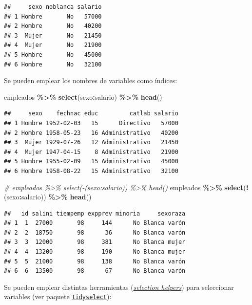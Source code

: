 \documentclass[
]{book}
\newenvironment{Shaded}{\begin{snugshade}}{\end{snugshade}}
\newcommand{\CommentTok}[1]{\textcolor[rgb]{0.56,0.35,0.01}{\textit{#1}}}
\newcommand{\FunctionTok}[1]{\textcolor[rgb]{0.13,0.29,0.53}{\textbf{#1}}}
\newcommand{\NormalTok}[1]{#1}
\newcommand{\SpecialCharTok}[1]{\textcolor[rgb]{0.81,0.36,0.00}{\textbf{#1}}}
\begin{document}
\begin{verbatim}
##     sexo noblanca salario
## 1 Hombre       No   57000
## 2 Hombre       No   40200
## 3  Mujer       No   21450
## 4  Mujer       No   21900
## 5 Hombre       No   45000
## 6 Hombre       No   32100
\end{verbatim}

Se pueden emplear los nombres de variables como índices:

\begin{Shaded}
\begin{Highlighting}[]
\NormalTok{empleados }\SpecialCharTok{\%\textgreater{}\%} \FunctionTok{select}\NormalTok{(sexo}\SpecialCharTok{:}\NormalTok{salario) }\SpecialCharTok{\%\textgreater{}\%} \FunctionTok{head}\NormalTok{()}
\end{Highlighting}
\end{Shaded}

\begin{verbatim}
##     sexo    fechnac educ         catlab salario
## 1 Hombre 1952-02-03   15      Directivo   57000
## 2 Hombre 1958-05-23   16 Administrativo   40200
## 3  Mujer 1929-07-26   12 Administrativo   21450
## 4  Mujer 1947-04-15    8 Administrativo   21900
## 5 Hombre 1955-02-09   15 Administrativo   45000
## 6 Hombre 1958-08-22   15 Administrativo   32100
\end{verbatim}

\begin{Shaded}
\begin{Highlighting}[]
\CommentTok{\# empleados \%\textgreater{}\% select({-}(sexo:salario)) \%\textgreater{}\% head()}
\NormalTok{empleados }\SpecialCharTok{\%\textgreater{}\%} \FunctionTok{select}\NormalTok{(}\SpecialCharTok{!}\NormalTok{(sexo}\SpecialCharTok{:}\NormalTok{salario)) }\SpecialCharTok{\%\textgreater{}\%} \FunctionTok{head}\NormalTok{()}
\end{Highlighting}
\end{Shaded}

\begin{verbatim}
##   id salini tiempemp expprev minoria     sexoraza
## 1  1  27000       98     144      No Blanca varón
## 2  2  18750       98      36      No Blanca varón
## 3  3  12000       98     381      No Blanca mujer
## 4  4  13200       98     190      No Blanca mujer
## 5  5  21000       98     138      No Blanca varón
## 6  6  13500       98      67      No Blanca varón
\end{verbatim}

Se pueden emplear distintas herramientas (\emph{\href{https://tidyselect.r-lib.org/reference/language.html}{selection helpers}}) para seleccionar variables (ver paquete \href{https://tidyselect.r-lib.org}{\texttt{tidyselect}}):
\end{document}
